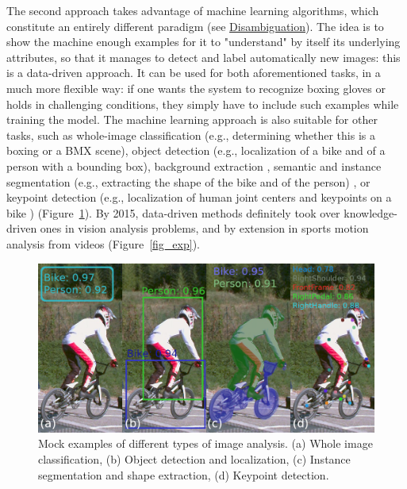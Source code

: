 
The second approach takes advantage of machine learning algorithms, which constitute an entirely different paradigm (see \hyperlink{Ann:gloss}{Disambiguation}). The idea is to show the machine enough examples for it to "understand" by itself its underlying attributes, so that it manages to detect and label automatically new images: this is a data-driven approach. It can be used for both aforementioned tasks, in a much more flexible way: if one wants the system to recognize boxing gloves or holds in challenging conditions, they simply have to include such examples while training the model. The machine learning approach is also suitable for other tasks, such as whole-image classification (e.g., determining whether this is a boxing or a BMX scene), object detection (e.g., localization of a bike and of a person with a bounding box), background extraction \cite{Bouwmans2019}, semantic and instance segmentation (e.g., extracting the shape of the bike and of the person) \cite{Minaee2021}, or keypoint detection (e.g., localization of human joint centers and keypoints on a bike \cite{Chen2020a}) (Figure~\ref{fig_classif_detec}). By 2015, data-driven methods definitely took over knowledge-driven ones in vision analysis problems, and by extension in sports motion analysis from videos (Figure~\ref{fig_exp}).

\clearpage
\begin{figure}[!ht]
	\centering
	\def\svgwidth{1\columnwidth}
	\fontsize{10pt}{10pt}\selectfont
	\includegraphics[width=\linewidth]{"../Chap2/Figures/Fig_classif_detec.png"}
	\caption{Mock examples of different types of image analysis. (a) Whole image classification, (b) Object detection and localization, (c) Instance segmentation and shape extraction, (d) Keypoint detection.}
	\label{fig_classif_detec}
\end{figure}

